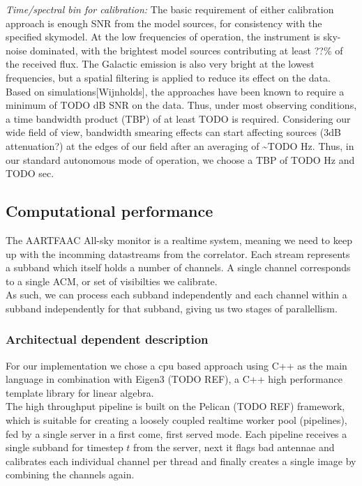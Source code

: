 \documentclass{aa}
\begin{document}
\emph{Time/spectral  bin  for  calibration:  }The basic  requirement  of  either
calibration approach is enough SNR  from the model sources, for consistency with
the specified skymodel.  At the low frequencies of  operation, the instrument is
sky-noise dominated, with the brightest model sources contributing at least ??\%
of the  received flux. The Galactic emission  is also very bright  at the lowest
frequencies, but  a spatial  filtering is  applied to reduce  its effect  on the
data.  Based on simulations{[}Wijnholds{]},  the approaches  have been  known to
require  a minimum  of  TODO dB  SNR on  the  data. Thus,  under most  observing
conditions,   a   time  bandwidth   product   (TBP)   of   at  least   TODO   is
required. Considering  our wide  field of view,  bandwidth smearing  effects can
start affecting  sources (3dB attenuation?) at  the edges of our  field after an
averaging of \textasciitilde{}TODO Hz. Thus,  in our standard autonomous mode of
operation, we choose a TBP of TODO Hz and TODO sec.


\subsection{\label{sub:Computational-performance}Computational performance}
The AARTFAAC All-sky monitor is a realtime system, meaning we need to keep up
with the incomming datastreams from the correlator. Each stream represents a
subband which itself holds a number of channels. A single channel corresponds
to a single ACM, or set of visibilties we calibrate. \\
As such, we can process each subband independently and each channel within a
subband independently for that subband, giving us two stages of parallellism.

\subsubsection{Architectual dependent description}
For our implementation we chose a cpu based approach using C++ as the main
language in combination with Eigen3 (TODO REF), a C++ high performance template
library for linear algebra. \\
The high throughput pipeline is built on the Pelican (TODO REF) framework,
which is suitable for creating a loosely coupled realtime worker pool
(pipelines), fed by a single server in a first come, first served mode.  Each
pipeline receives a single subband for timestep $t$ from the server, next it
flags bad antennae and calibrates each individual channel per thread and
finally creates a single image by combining the channels again.
\end{document}
